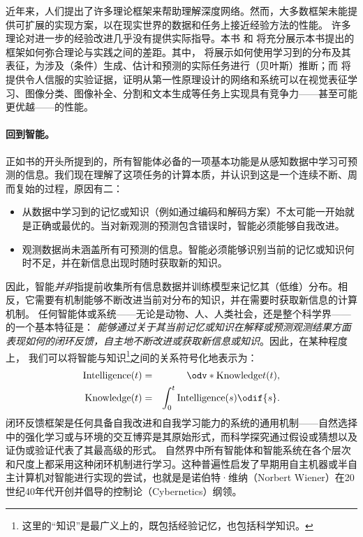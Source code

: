 \documentclass[../../book-main_zh.tex]{subfiles}
\begin{document}
近年来，人们提出了许多理论框架来帮助理解深度网络。然而，大多数框架未能提供可扩展的实现方案，以在现实世界的数据和任务上接近经验方法的性能。
许多理论对进一步的经验改进几乎没有提供实际指导。本书
和  将充分展示本书提出的框架如何弥合理论与实践之间的差距。其中，
将展示如何使用学习到的分布及其表征，为涉及（条件）生成、估计和预测的实际任务进行（贝叶斯）推断；而
将提供令人信服的实验证据，证明从第一性原理设计的网络和系统可以在视觉表征学习、图像分类、图像补全、分割和文本生成等任务上实现具有竞争力——甚至可能更优越——的性能。

\paragraph{回到智能。}
正如书的开头所提到的，所有智能体必备的一项基本功能是从感知数据中学习可预测的信息。我们现在理解了这项任务的计算本质，并认识到这是一个连续不断、周而复始的过程，原因有二：
\begin{itemize}
    \item 从数据中学习到的记忆或知识（例如通过编码和解码方案）不太可能一开始就是正确或最优的。当对新观测的预测包含错误时，智能必须能够自我改进。
    \item 观测数据尚未涵盖所有可预测的信息。智能必须能够识别当前的记忆或知识何时不足，并在新信息出现时随时获取新的知识。
\end{itemize}

因此，智能\textit{并非}指提前收集所有信息数据并训练模型来记忆其（低维）分布。相反，它需要有机制能够不断改进当前对分布的知识，并在需要时获取新信息的计算机制。
任何智能体或系统——无论是动物、人、人类社会，还是整个科学界——的一个基本特征是：
\textit{能够通过关于其当前记忆或知识在解释或预测观测结果方面表现如何的闭环反馈，自主地不断改进或获取新信息或知识}。因此，在某种程度上，
我们可以将智能与知识\footnote{这里的“知识”是最广义上的，既包括经验记忆，也包括科学知识。}之间的关系符号化地表示为：
\begin{eqnarray*}
    \operatorname{Intelligence}(t) &=&
    \odv*{\operatorname{Knowledge}}{t}(t), \\
    \operatorname{Knowledge}(t)  &=& \int_{0}^{t}
    \operatorname{Intelligence}(s) \odif{s}.
\end{eqnarray*}
闭环反馈框架是任何具备自我改进和自我学习能力的系统的通用机制——自然选择中的强化学习或与环境的交互博弈是其原始形式，而科学探究通过假设或猜想以及证伪或验证代表了其最高级的形式。
自然界中所有智能体和智能系统在各个层次和尺度上都采用这种闭环机制进行学习。这种普遍性启发了早期用自主机器或半自主计算机对智能进行实现的尝试，也就是是诺伯特·维纳（Norbert
Wiener）在20世纪40年代开创并倡导的控制论（Cybernetics）纲领。
\end{document}

